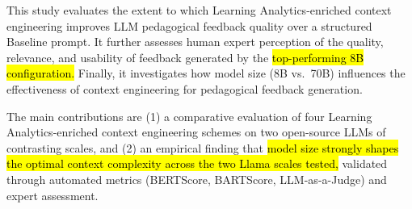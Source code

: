 \documentclass[conference,a4paper]{IEEEtran}
\begin{document}
%
%
%


This study evaluates the extent to which
Learning Analytics-enriched context engineering
improves LLM pedagogical feedback quality over
a structured Baseline prompt. It further assesses
human expert perception of the quality, relevance,
and usability of feedback generated by the
\hl{top-performing 8B configuration.} Finally, it
investigates how model size (8B vs.\ 70B)
influences the effectiveness of context engineering
for pedagogical feedback generation.

The main contributions are (1) a comparative evaluation of
four Learning Analytics-enriched context engineering schemes on two
open-source LLMs of contrasting scales, and (2) an empirical
finding that \hl{model size strongly shapes the optimal
context complexity across the two Llama scales tested,} validated
through automated metrics (BERTScore, BARTScore, LLM-as-a-Judge)
and expert assessment.
\end{document}
